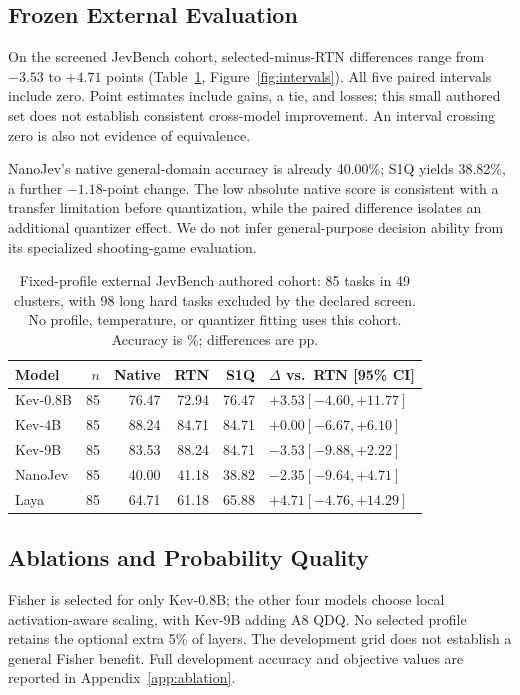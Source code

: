 \documentclass[10pt,twocolumn]{article}
\begin{document}
\subsection{Frozen External Evaluation}
On the screened JevBench cohort, selected-minus-RTN differences
range from $-3.53$ to $+4.71$ points
(Table~\ref{tab:external}, Figure~\ref{fig:intervals}).
All five paired intervals include zero. Point estimates include
gains, a tie, and losses; this small authored set does not establish
consistent cross-model improvement. An interval crossing zero is
also not evidence of equivalence.

NanoJev's native general-domain accuracy is already 40.00\%;
S1Q yields 38.82\%, a further $-1.18$-point change.
The low absolute native score is consistent with a transfer limitation before
quantization, while the paired difference isolates an additional
quantizer effect. We do not infer general-purpose decision ability
from its specialized shooting-game evaluation.

\begin{table}[t]
\centering\small
\begin{tabular}{lrrrrl}
\toprule
Model & $n$ & Native & RTN & S1Q & $\Delta$ vs.\ RTN [95\% CI]\\
\midrule
Kev-0.8B & 85 & 76.47 & 72.94 & 76.47 & $+3.53 [-4.60, +11.77]$ \\
Kev-4B & 85 & 88.24 & 84.71 & 84.71 & $+0.00 [-6.67, +6.10]$ \\
Kev-9B & 85 & 83.53 & 88.24 & 84.71 & $-3.53 [-9.88, +2.22]$ \\
NanoJev & 85 & 40.00 & 41.18 & 38.82 & $-2.35 [-9.64, +4.71]$ \\
Laya & 85 & 64.71 & 61.18 & 65.88 & $+4.71 [-4.76, +14.29]$ \\
\bottomrule
\end{tabular}
\caption{Fixed-profile external JevBench authored cohort: 85 tasks in
49 clusters, with 98 long hard tasks excluded by the declared screen.
No profile, temperature, or quantizer fitting uses this cohort.
Accuracy is \%; differences are pp.}
\label{tab:external}
\end{table}

\subsection{Ablations and Probability Quality}
Fisher is selected for only Kev-0.8B; the other four models choose
local activation-aware scaling, with Kev-9B adding A8 QDQ.
No selected profile retains the optional extra 5\% of layers.
The development grid does not establish a general Fisher
benefit. Full development accuracy and objective values are reported
in Appendix~\ref{app:ablation}.
\end{document}
